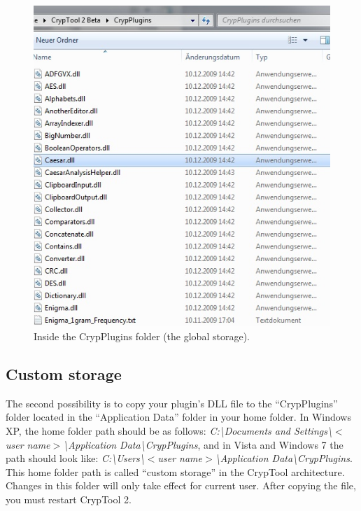 \begin{figure}[h]
	\centering
		\includegraphics{figures/global_storage.jpg}
	\caption{Inside the CrypPlugins folder (the global storage).}
	\label{fig:global_storage}
\end{figure}

\subsection{Custom storage}
\label{sec:CustomStorage}

The second possibility is to copy your plugin's DLL file to the ``CrypPlugins'' folder located in the ``Application Data'' folder in your home folder. In Windows XP, the home folder path should be as follows: \textit{C:\textbackslash Documents and Settings\textbackslash $<$user name$>$\textbackslash Application Data\textbackslash CrypPlugins}, and in Vista and Windows 7 the path should look like: \textit{C:\textbackslash Users\textbackslash $<$user name$>$\textbackslash Application Data\textbackslash CrypPlugins}. This home folder path is called ``custom storage'' in the CrypTool architecture. Changes in this folder will only take effect for current user. After copying the file, you must restart CrypTool 2.
\clearpage


